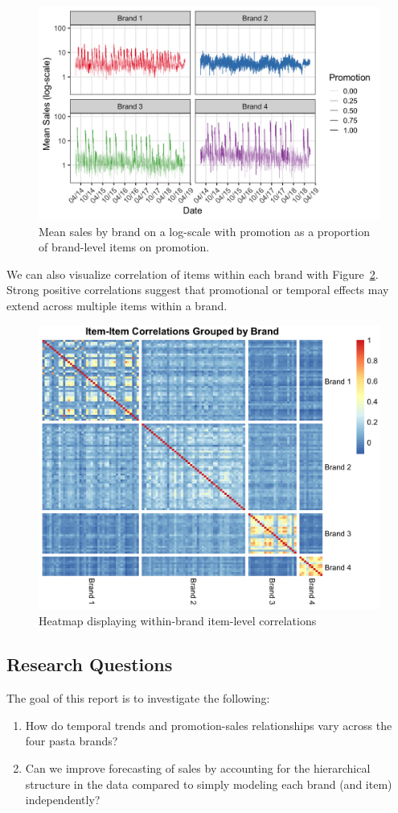 \documentclass{article}
\begin{document}
\begin{figure}[ht]
    \centering
    \includegraphics[width=0.6\linewidth]{figures/logscale_facet_meanSales.png}
    \caption{Mean sales by brand on a log-scale with promotion as a proportion of brand-level items on promotion.}
    \label{fig:logscaleMeanSales}
\end{figure}

\noindent We can also visualize correlation of items within each brand with Figure~\ref{fig:heatmap}. Strong positive correlations suggest that promotional or temporal effects may extend across multiple items within a brand.

\begin{figure}[ht]
    \centering
    \includegraphics[width=0.5\linewidth]{figures/heatmap.png}
    \caption{Heatmap displaying within-brand item-level correlations}
    \label{fig:heatmap}
\end{figure}

\subsection*{Research Questions}

\noindent The goal of this report is to investigate the following:

\begin{enumerate}
    \item How do temporal trends and promotion-sales relationships vary across the four pasta brands?
    \item Can we improve forecasting of sales by accounting for the hierarchical structure in the data compared to simply modeling each brand (and item) independently?
\end{enumerate}
\end{document}

